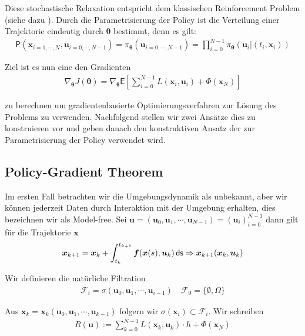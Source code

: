 \documentclass[a4paper, 12pt]{scrartcl}
\newcommand{\ds}{\thinspace \mathsf{ds}}
\begin{document}
Diese stochastische Relaxation entspricht dem klassischen
Reinforcement Problem (siehe dazu \cite{Plaat_RL}).
Durch die Parametrisierung der Policy ist die Verteilung einer Trajektorie
eindeutig durch $\bm{\theta}$ bestimmt, denn es gilt:
%
\begin{align*}
    \mathsf{P}(\bm{x}_{i=1,\cdots, N}, \bm{u}_{i=0, \cdots, N-1})
    =
    \pi_{\bm{\theta}}(\bm{u}_{i=0, \cdots, N-1})
    =
    \prod_{i=0}^{N-1} \pi_{\bm{\theta}}(\bm{u}_i| (t_i,\bm{x}_i))
\end{align*}


Ziel ist es nun eine den Gradienten 
%
\begin{align*}
    \nabla_{\bm{\theta}} J(\bm{\theta}) 
    =
    \nabla_{\bm{\theta}} 
    \mathsf{E}
    \left[
        \sum_{i=0}^{N-1}
        L(\bm{x}_i, \bm{u}_i) 
        +
        \Phi(\bm{x}_N)
    \right]
\end{align*}

zu berechnen um gradientenbasierte Optimierungsverfahren zur Lösung des Problems
zu verwenden. Nachfolgend stellen wir zwei Ansätze dies zu konstruieren vor und 
geben danach den konstruktiven Ansatz der zur Parametrisierung der Policy verwendet wird.

\subsection{Policy-Gradient Theorem}

Im ersten Fall betrachten wir die Umgebungsdynamik als unbekannt, aber wir 
können jederzeit Daten durch Interaktion mit der Umgebung erhalten, 
dies bezeichnen wir als Model-free.
Sei $\bm{u} = (\bm{u}_0 , \bm{u}_1 , \cdots , \bm{u}_{N-1}) = \left( \bm{u}_{i} \right)_{i=0}^{N-1}$
dann gilt für die Trajektorie $\bm{x}$
%
\begin{align*}
    \bm{x}_{k+1} 
    = 
    \bm{x}_k + \int_{t_k}^{t_{k+1}} \bm{f}(\bm{x}(s), \bm{u}_k) \ds 
    \Rightarrow
    \bm{x}_{k+1}(\bm{x}_k , \bm{u}_k)
\end{align*}
 
Wir definieren die natürliche Filtration
%
\begin{align*}
    \mathcal{F}_i = \sigma(\bm{u}_0 , \bm{u}_1 , \cdots , \bm{u}_{i-1})
    \quad
    \mathcal{F}_0 = \{\emptyset , \Omega \}
\end{align*}

Aus $\bm{x}_{k} = \bm{x}_k (\bm{u}_0 , \bm{u}_1 , \cdots , \bm{u}_{k-1})$
folgern wir $\sigma(\bm{x}_i) \subset \mathcal{F}_i$. Wir schreiben 
%
\begin{align*}
    R(\bm{u}) := \sum_{k=0}^{N-1} L(\bm{x}_k, \bm{u}_k) \cdot h + \Phi(\bm{x}_N)
\end{align*}
 
\end{document}
